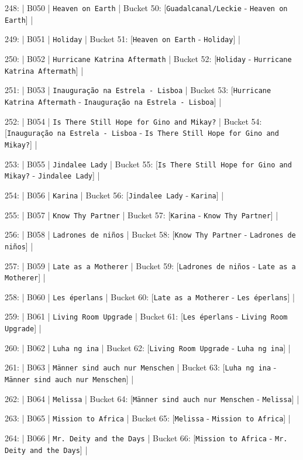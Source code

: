 \documentclass[11pt,a4paper]{article}
\begin{document}
{248: | B050 | \texttt{Heaven on Earth} | Bucket 50: [\texttt{Guadalcanal/Leckie} - \texttt{Heaven on Earth}] |

249: | B051 | \texttt{Holiday} | Bucket 51: [\texttt{Heaven on Earth} - \texttt{Holiday}] |

250: | B052 | \texttt{Hurricane Katrina Aftermath} | Bucket 52: [\texttt{Holiday} - \texttt{Hurricane Katrina Aftermath}] |

251: | B053 | \texttt{Inauguração na Estrela - Lisboa} | Bucket 53: [\texttt{Hurricane Katrina Aftermath} - \texttt{Inauguração na Estrela - Lisboa}] |

252: | B054 | \texttt{Is There Still Hope for Gino and Mikay?} | Bucket 54: [\texttt{Inauguração na Estrela - Lisboa} - \texttt{Is There Still Hope for Gino and Mikay?}] |

253: | B055 | \texttt{Jindalee Lady} | Bucket 55: [\texttt{Is There Still Hope for Gino and Mikay?} - \texttt{Jindalee Lady}] |

254: | B056 | \texttt{Karina} | Bucket 56: [\texttt{Jindalee Lady} - \texttt{Karina}] |

255: | B057 | \texttt{Know Thy Partner} | Bucket 57: [\texttt{Karina} - \texttt{Know Thy Partner}] |

256: | B058 | \texttt{Ladrones de niños} | Bucket 58: [\texttt{Know Thy Partner} - \texttt{Ladrones de niños}] |

257: | B059 | \texttt{Late as a Mother\textbf{}er} | Bucket 59: [\texttt{Ladrones de niños} - \texttt{Late as a Mother\textbf{}er}] |

258: | B060 | \texttt{Les éperlans} | Bucket 60: [\texttt{Late as a Mother\textbf{}er} - \texttt{Les éperlans}] |

259: | B061 | \texttt{Living Room Upgrade} | Bucket 61: [\texttt{Les éperlans} - \texttt{Living Room Upgrade}] |

260: | B062 | \texttt{Luha ng ina} | Bucket 62: [\texttt{Living Room Upgrade} - \texttt{Luha ng ina}] |

261: | B063 | \texttt{Männer sind auch nur Menschen} | Bucket 63: [\texttt{Luha ng ina} - \texttt{Männer sind auch nur Menschen}] |

262: | B064 | \texttt{Melissa} | Bucket 64: [\texttt{Männer sind auch nur Menschen} - \texttt{Melissa}] |

263: | B065 | \texttt{Mission to Africa} | Bucket 65: [\texttt{Melissa} - \texttt{Mission to Africa}] |

264: | B066 | \texttt{Mr. Deity and the Days} | Bucket 66: [\texttt{Mission to Africa} - \texttt{Mr. Deity and the Days}] |

}
\end{document}
